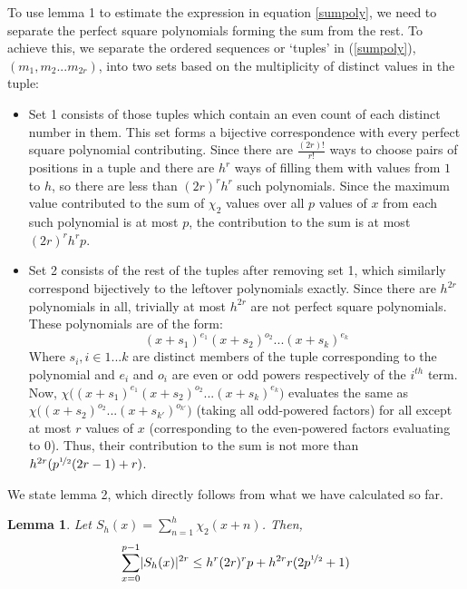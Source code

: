 \documentclass{report}
\newtheorem{lemma}{Lemma}
\begin{document}
To use lemma 1 to estimate the expression in equation \ref{sumpoly}, we need to separate the perfect square polynomials forming the sum from the rest. To achieve this, we separate the ordered sequences or `tuples' in (\ref{sumpoly}), $(m_1, m_2...m_{2r})$, into two sets based on the multiplicity of distinct values in the tuple:
\begin{itemize}
  \item Set 1 consists of those tuples which contain an even count of each distinct number in them. This set forms a bijective correspondence with every perfect square polynomial contributing. Since there are $\frac{(2r)!}{r!}$ ways to choose pairs of positions in a tuple and there are $h^{r}$ ways of filling them with values from $1$ to $h$, so there are less than $(2r)^r h^{r}$ such polynomials. Since the maximum value contributed to the sum of $\chi_2$ values over all $p$ values of $x$ from each such polynomial is at most $p$, the contribution to the sum is at most $(2r)^r h^{r}p$.
  \item Set 2 consists of the rest of the tuples after removing set 1, which similarly correspond bijectively to the leftover polynomials exactly. Since there are $h^{2r}$ polynomials in all, trivially at most $h^{2r}$ are not perfect square polynomials. These polynomials are of the form:
  $$(x+s_1)^{e_1}(x+s_2)^{o_2}...(x+s_k)^{e_k}$$
  Where $s_i, i\in 1...k$ are distinct members of the tuple corresponding to the polynomial and $e_i$ and $o_i$ are even or odd powers respectively of the $i^{th}$ term. Now, $\chi\big((x+s_1)^{e_1}(x+s_2)^{o_2}...(x+s_k)^{e_k}\big)$ evaluates the same as $\chi\big((x+s_2)^{o_2}...(x+s_{k'})^{o_{k'}}\big)$ (taking all odd-powered factors) for all except at most $r$ values of $x$ (corresponding to the even-powered factors evaluating to $0$). Thus, their contribution to the sum is not more than $h^{2r}(p^{\nicefrac{1}{2}}(2r-1)+r)$.
\end{itemize}
%
We state lemma 2, which directly follows from what we have calculated so far.
%
\begin{lemma} \label{lemma2statement}
Let $S_h(x)=\sum\limits_{n=1}^{h}\chi_2(x+n)$. Then,
\begin{equation} \label{lemma2}
\sum\limits_{x=0}^{p-1}\lvert S_h(x)\rvert ^{2r}\leq h^{r}(2r)^{r}p+h^{2r}r(2p^{\nicefrac{1}{2}}+1)
\end{equation}
\end{lemma}
\end{document}
